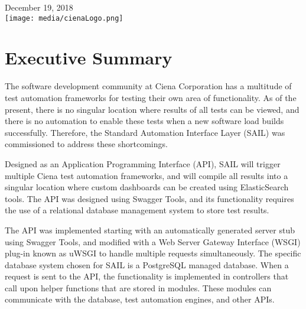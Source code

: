 \documentclass[10pt, titlepage, onecolumn, openany]{article}
\newcommand\frontmatter{
    \cleardoublepage
    \pagenumbering{roman}
}
\begin{document}
\begin{titlepage}

{\large December 19, 2018}\\[2cm] %


\texttt{[image: media/cienaLogo.png]}\\[1cm] %


\vfill %

\end{titlepage}
\frontmatter
\section*{Executive Summary}

The software development community at Ciena Corporation has a multitude of test
automation frameworks for testing their own area of functionality. As of the
present, there is no singular location where results of all tests can be viewed,
and there is no automation to enable these tests when a new software load builds
successfully. Therefore, the Standard Automation Interface Layer (SAIL) was
commissioned to address these shortcomings.

Designed as an Application Programming Interface (API), SAIL will trigger multiple Ciena
test automation frameworks, and will compile all results into a singular location
where custom dashboards can be created using ElasticSearch tools. The API was
designed using Swagger Tools, and its functionality requires the use of a
relational database management system to store test results.

The API was implemented starting with an automatically generated server stub
using Swagger Tools, and modified with a Web Server Gateway Interface (WSGI)
plug-in known as uWSGI to handle multiple requests simultaneously. The specific
database system chosen for SAIL is a PostgreSQL managed database. When a request
is sent to the API, the functionality is implemented in controllers that call upon
helper functions that are stored in modules. These modules can communicate with
the database, test automation engines, and other APIs.
\end{document}
